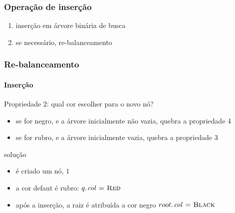 \documentclass{beamer}
\begin{document}
\begin{frame}

\frametitle{Operação de inserção}

\begin{enumerate}

\item inserção em árvore binária de busca

\item \alert{se necessário}, re-balanceamento

\end{enumerate}

\end{frame}

\begin{frame}

\frametitle{Re-balanceamento}
\framesubtitle{Inserção}

Propriedade 2: qual cor escolher para o novo nó?

\begin{itemize}

\item se for negro, e a árvore inicialmente não vazia, quebra a propriedade 4

\item se for rubro, e a árvore inicialmente vazia, quebra a propriedade 3

\end{itemize}

\pause
\alert{solução}

\begin{itemize}

\item é criado um nó, $1$

\item a cor defaut é rubro: $\attrib{q}{col} \gets \const{Red}$

\item após a inserção, a raiz é atribuída a cor negro
$\attrib{root}{col} \gets \const{Black}$

\end{itemize}

\end{frame}
\end{document}
